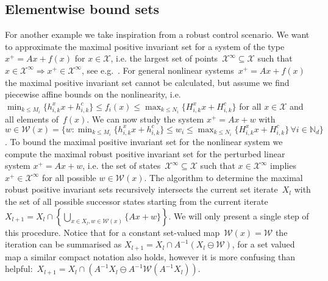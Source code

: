 \documentclass[smallextended]{svjour3}       %
\numberwithin{equation}{section}
\begin{document}
\subsection{Elementwise bound sets}\label{exp:second:example}
%
For another example we take inspiration from a robust control scenario.
%
We want to approximate the maximal positive invariant set for a system of the type~$x^+=Ax + f(x)$ for $x\in\mathcal X$, i.e. the largest set of points~$\mathcal X^\infty\subseteq\mathcal X$ such that $x\in\mathcal X^\infty\Rightarrow x^+\in\mathcal X^\infty$, see e.g.~\cite{blanchini:2007}.
%
For general nonlinear systems~$x^+=Ax + f(x)$ the maximal positive invariant set cannot be calculated, but assume we find piecewise affine bounds on the nonlinearity, i.e. $\min_{k\leq M_i}\{h_{i,k}^x x + h_{i,k}^c\}\leq f_i(x)\leq\max_{k\leq N_i}\{H_{i,k}^x x + H_{i,k}^c\}$ for all $x\in\mathcal X$ and all elements of~$f(x)$.
%
We can now study the system $x^+=Ax+w$ with $w\in\mathcal W(x) = \{w:\min_{k\leq M_i}\{h_{i,k}^x x + h_{i,k}^c\}\leq w_i\leq\max_{k\leq N_i}\{H_{i,k}^x x + H_{i,k}^c\}\,\forall i\in\mathbb N_d\}$.
%
To bound the maximal positive invariant set for the nonlinear system we compute the maximal robust positive invariant set for the perturbed linear system $x^+=Ax+w$, i.e. the set of states~$\mathscr X^\infty\subseteq\mathcal X$ such that $x\in\mathscr X^\infty$ implies $x^+\in\mathscr X^\infty$ for all possible $w\in\mathcal W(x)$.
%
The algorithm to determine the maximal robust positive invariant sets recursively intersects the current set iterate~$X_l$ with the set of all possible successor states starting from the current iterate $X_{l+1}=X_l\cap\left\{\bigcup_{x\in X_l,w\in\mathcal W(x)}\{Ax+w\}\right\}$.
%
We will only present a single step of this procedure.
%
Notice that for a constant set-valued map~$\mathcal W(x) = \mathcal W$ the iteration can be summarised as $X_{l+1} = X_l\cap A^{-1}(X_l\ominus\mathcal W)$, for a set valued map a similar compact notation also holds, however it is more confusing than helpful:~$X_{l+1}=X_l\cap(A^{-1}X_l\ominus A^{-1}\mathcal W(A^{-1}X_l))$.
\end{document}
